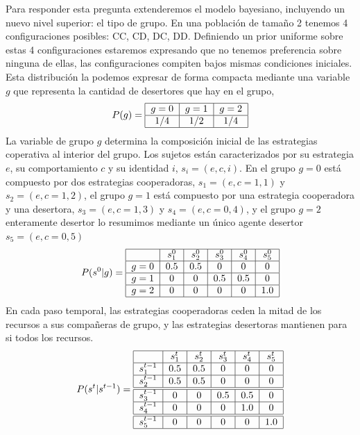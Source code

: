 \documentclass[a4paper,10pt]{article}
\begin{document}

Para responder esta pregunta extenderemos el modelo bayesiano, incluyendo un nuevo nivel superior: el tipo de grupo.
En una población de tamaño 2 tenemos 4 configuraciones posibles: CC, CD, DC, DD.
Definiendo un prior uniforme sobre estas 4 configuraciones estaremos expresando que no tenemos preferencia sobre ninguna de ellas, las configuraciones compiten bajos mismas condiciones iniciales.
Esta distribución la podemos expresar de forma compacta mediante una variable $g$ que representa la cantidad de desertores que hay en el grupo,
%
\begin{align}
\centering
P(g) = \begin{tabular}{|c|c|c|c|}
        \hline
        $g=0$ & $g=1$ & $g=2$ \\ \hline
        $1/4$ & $1/2$ & $1/4$ \\ \hline
\end{tabular}
\end{align}
%
La variable de grupo $g$ determina la composición inicial de las estrategias coperativa al interior del grupo.
Los sujetos están caracterizados por su estrategia $e$, su comportamiento $c$ y su identidad $i$, $s_i=(e,c,i)$.
En el grupo $g=0$ está compuesto por dos estrategias cooperadoras, $s_1=(e,c=1,1)$ y $s_2=(e,c=1,2)$, el grupo $g=1$ está compuesto por una estrategia cooperadora y una desertora, $s_3=(e,c=1,3)$ y $s_4=(e,c=0,4)$, y el grupo $g=2$ enteramente desertor lo resumimos mediante un único agente desertor $s_5=(e,c=0,5)$
%
\begin{align}
\centering
P(s^0|g) = \begin{tabular}{|c|c|c|c|c|c|}
        \hline
        & $s^0_1$ & $s^0_2$ & $s^0_3$ &  $s^0_4$ & $s^0_5$ \\ \hline
       $g=0$ & $0.5$ & $0.5$ & $0$ &  $0$ & $0$  \\ \hline
       $g=1$ & $0$ & $0$ & $0.5$ & $0.5$ & $0$ \\ \hline
       $g=2$ & $0$ & $0$ & $0$ & $0$ & $1.0$ \\ \hline
\end{tabular}
\end{align}
%
En cada paso temporal, las estrategias cooperadoras ceden la mitad de los recursos a sus compañeras de grupo, y las estrategias desertoras mantienen para si todos los recursos.
%
\begin{align}
\centering
P(s^{t}|s^{t-1}) = \begin{tabular}{|c|c|c|c|c|c|}
        \hline
        & $s^t_1$ & $s^t_2$ & $s^t_3$ & $s^t_4$ & $s^t_5$ \\ \hline
       $s^{t-1}_1$ & $0.5$ & $0.5$ & $0$ &  $0$ & $0$  \\ \hline
       $s^{t-1}_2$ & $0.5$ & $0.5$ & $0$ & $0$ & $0$  \\ \hline \hline
       $s^{t-1}_3$ & $0$ & $0$ & $0.5$ & $0.5$ & $0$  \\ \hline
       $s^{t-1}_4$ & $0$ & $0$ & $0$ & $1.0$ & $0$  \\ \hline \hline
       $s^{t-1}_5$ & $0$ & $0$ & $0$ & $0$ & $1.0$  \\ \hline
\end{tabular}
\end{align}
\end{document}
